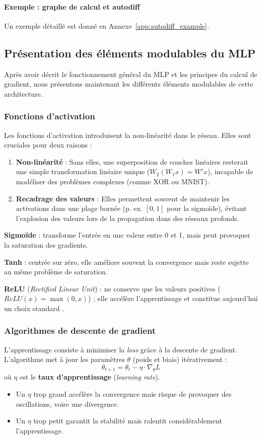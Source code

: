 \documentclass[a4paper,11pt]{article}
\begin{document}
\paragraph{Exemple : graphe de calcul et autodiff}
Un exemple détaillé est donné en Annexe~\ref{app:autodiff_example}.

\subsection{Présentation des éléments modulables du MLP}

Après avoir décrit le fonctionnement général du MLP et les principes du calcul de gradient, nous présentons maintenant les différents éléments modulables de cette architecture.

\subsubsection{Fonctions d'activation}
Les fonctions d'activation introduisent la non-linéarité dans le réseau. Elles sont cruciales pour deux raisons :
\begin{enumerate}
    \item \textbf{Non-linéarité} : Sans elles, une superposition de couches linéaires resterait une simple transformation linéaire unique ($W_2(W_1 x) = W'x$), incapable de modéliser des problèmes complexes (comme XOR ou MNIST).
    \item \textbf{Recadrage des valeurs} : Elles permettent souvent de maintenir les activations dans une plage bornée (p. ex. $[0,1]$ pour la sigmoïde), évitant l'explosion des valeurs lors de la propagation dans des réseaux profonds.
\end{enumerate}

\textbf{Sigmoïde} : transforme l'entrée en une valeur entre 0 et 1, mais peut provoquer la saturation des gradients. 

\textbf{Tanh} : centrée sur zéro, elle améliore souvent la convergence mais reste sujette au même problème de saturation. 

\textbf{ReLU} (\textit{Rectified Linear Unit}) : ne conserve que les valeurs positives ($ReLU(x) = \max(0, x)$) ; elle accélère l'apprentissage et constitue aujourd'hui un choix standard \cite{goodfellow2016}.

\subsubsection{Algorithmes de descente de gradient}\label{sec:theory_sgd}
L'apprentissage consiste à minimiser la \textit{loss} grâce à la descente de gradient. L'algorithme met à jour les paramètres $\theta$ (poids et biais) itérativement :
\[ \theta_{t+1} = \theta_t - \eta \cdot \nabla_\theta L \]
où $\eta$ est le \textbf{taux d'apprentissage} (\textit{learning rate}).
\begin{itemize}
    \item Un $\eta$ trop grand accélère la convergence mais risque de provoquer des oscillations, voire une divergence.
    \item Un $\eta$ trop petit garantit la stabilité mais ralentit considérablement l'apprentissage.
\end{itemize}
\end{document}
